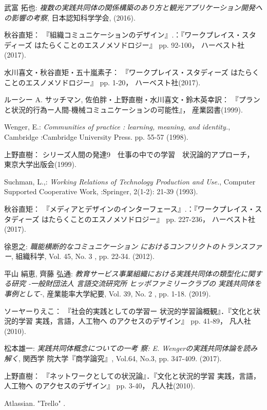 \documentclass[submit,techrep]{ipsj}
\begin{document}
\begin{thebibliography}{9}


  武富 拓也: {\it 複数の実践共同体の関係構築のあり方と観光アプリケーション開発への影響の考察},
    日本認知科学学会,
    (2016).

  秋谷直矩：
  『組織コミュニケーションのデザイン』.：『ワークプレイス・スタディーズ はたらくことのエスノメソドロジー』 pp. 92-100，
  ハーベスト社(2017).

  水川喜文・秋谷直矩・五十嵐素子：
  『ワークプレイス・スタディーズ はたらくことのエスノメソドロジー』 pp. 1-20，
  ハーベスト社(2017).

ルーシー A. サッチマン, 佐伯胖・上野直樹・水川喜文・鈴木英幸訳：
『プランと状況的行為ー人間-機械コミュニケーションの可能性』，
産業図書(1999).

Wenger, E.: {\it Communities of practice : learning,
meaning, and identity.},
Cambridge :Cambridge University
Press. pp. 55-57 (1998).

上野直樹：
シリーズ人間の発達9　仕事の中での学習　状況論的アプローチ，
東京大学出版会(1999).

Suchman, L.,: {\it Working Relations of Technology Production and Use.},
Computer Supported Cooperative Work, :Springer,
2(1-2): 21-39 (1993).

  秋谷直矩：
  『メディアとデザインのインターフェース』.：『ワークプレイス・スタディーズ はたらくことのエスノメソドロジー』 pp. 227-236，
  ハーベスト社(2017).

  徐恩之: {\it 職能横断的なコミュニケーション
  におけるコンフリクトのトランスファー},
  組織科学,
  Vol. 45, No. 3 , pp. 22-34. (2012).

  平山 絹恵, 齊藤 弘通: {\it 教育サービス事業組織における実践共同体の類型化に関する研究 -一般財団法人 言語交流研究所 ヒッポファミリークラブの
実践共同体を事例として-},
  産業能率大学紀要,
  Vol. 39, No. 2 , pp. 1-18. (2019).

  ソーヤーりえこ：
  『社会的実践としての学習ー 状況的学習論概観』．『文化と状況的学習 実践，言語，人工物へ のアクセスのデザイン』 pp. 41-89，
  凡人社(2010).

  松本雄一: {\it 実践共同体概念についての一考 察: E. Wengerの実践共同体論を読み解く},
  関西学 院大学『商学論究』,
  Vol.64, No.3, pp. 347-409. (2017).

上野直樹：
『ネットワークとしての状況論』．『文化と状況的学習 実践，言語，人工物へ のアクセスのデザイン』 pp. 3-40，
凡人社(2010).

Atlassian.
"Trello"
%
.


\end{thebibliography}
\end{document}
